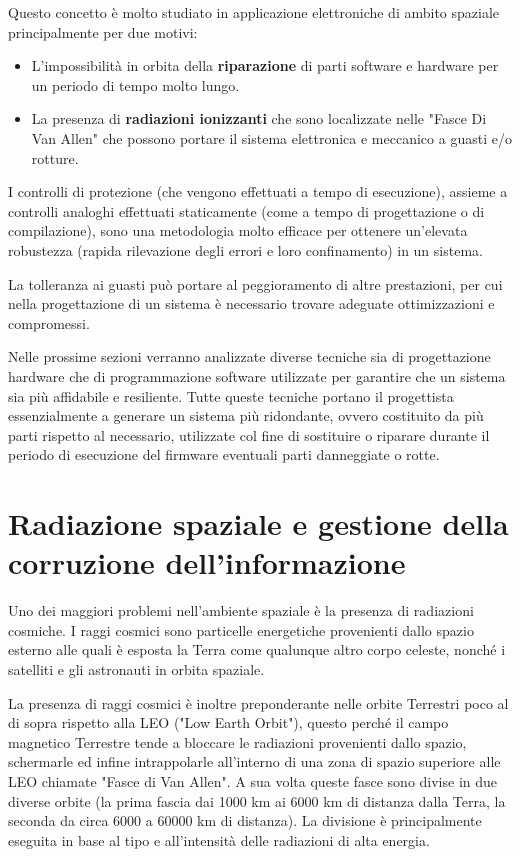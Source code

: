 \documentclass[LaM,binding=0.6cm]{../sapthesis}
\begin{document}
Questo concetto è molto studiato in applicazione elettroniche di ambito spaziale principalmente per due motivi:
\begin{itemize}
    \item L'impossibilità in orbita della \textbf{riparazione} di parti software e hardware per un periodo di tempo molto lungo.
    
    \item La presenza di \textbf{radiazioni ionizzanti} che sono localizzate nelle "Fasce Di Van Allen" che possono portare il sistema elettronica e meccanico a guasti e/o rotture.
\end{itemize}

I controlli di protezione (che vengono effettuati a tempo di esecuzione), assieme a controlli analoghi effettuati staticamente (come a tempo di progettazione o di compilazione), sono una metodologia molto efficace per ottenere un'elevata robustezza (rapida rilevazione degli errori e loro confinamento) in un sistema. 

La tolleranza ai guasti può portare al peggioramento di altre prestazioni, per cui nella progettazione di un sistema è necessario trovare adeguate ottimizzazioni e compromessi. 

Nelle prossime sezioni verranno analizzate diverse tecniche sia di progettazione hardware che di programmazione software utilizzate per garantire che un sistema sia più affidabile e resiliente. Tutte queste tecniche portano il progettista essenzialmente a generare un sistema più ridondante, ovvero costituito da più parti rispetto al necessario, utilizzate col fine di sostituire o riparare durante il periodo di esecuzione del firmware eventuali parti danneggiate o rotte.

\section{Radiazione spaziale e gestione della corruzione dell'informazione}

Uno dei maggiori problemi nell'ambiente spaziale è la presenza di radiazioni cosmiche.
I raggi cosmici sono particelle energetiche provenienti dallo spazio esterno alle quali è esposta la Terra come qualunque altro corpo celeste, nonché i satelliti e gli astronauti in orbita spaziale.

La presenza di raggi cosmici è inoltre preponderante nelle orbite Terrestri poco al di sopra rispetto alla LEO ("Low Earth Orbit"), questo perché il campo magnetico Terrestre tende a bloccare le radiazioni provenienti dallo spazio, schermarle ed infine intrappolarle all'interno di una zona di spazio superiore alle LEO chiamate "Fasce di Van Allen".
A sua volta queste fasce sono divise in due diverse orbite (la prima fascia dai 1000 km ai 6000 km di distanza dalla Terra, la seconda da circa 6000 a 60000 km di distanza). La divisione è principalmente eseguita in base al tipo e all'intensità delle radiazioni di alta energia.
\end{document}
